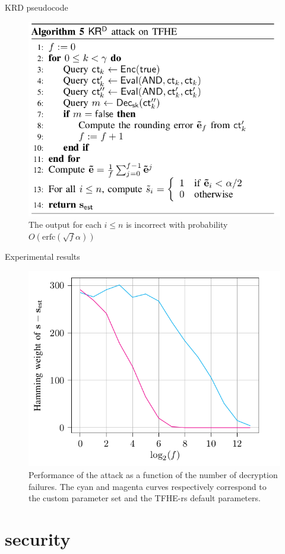 \documentclass{beamer}
\begin{document}
	\begin{frame}{KRD pseudocode}
		\begin{figure}
			\centering
			\includegraphics[width=0.8\linewidth]{tkrd}
			\caption{The output for each $i \leq n$ is incorrect with probability $O(\text{erfc}(\sqrt{f} \alpha))$}
			\label{fig:tkrd}
		\end{figure}
	\end{frame}

	\begin{frame}{Experimental results}
		\begin{figure}
			\centering
			\includegraphics[width=0.7\linewidth]{exp}
			\caption{Performance of the attack as a function of the number of decryption failures. The cyan and magenta curves respectively correspond to the custom parameter set and the TFHE-rs default parameters.}
			\label{fig:tkrd}
		\end{figure}
	\end{frame}

	\section{\indcpad security}
	
\end{document}
